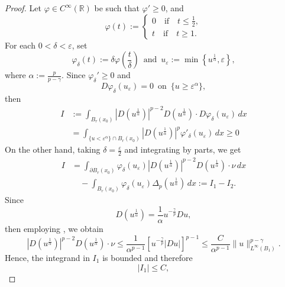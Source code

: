 \documentclass[10pt,a4paper]{amsart}
\newcommand{\R}{\mathbb{R}}
\begin{document}
\begin{proof}
    Let $\varphi\in C^\infty(\R)$ be such that $\varphi'\ge0$, and
    \begin{equation*}
    \varphi(t):=
    \begin{cases}
    0 \quad \textrm{if} \quad t\le\frac{1}{2},\\
    t \quad \textrm{if} \quad t\ge 1.
    \end{cases}
    \end{equation*}
    For each $0<\delta<\varepsilon$, set
    \begin{equation*}
    \varphi_\delta(t):=\delta\varphi\left(\frac{t}{\delta}\right)\,\,\,\text{and}\,\,\,u_\varepsilon:=\min\left\{ u^\frac{1}{\alpha},\varepsilon\right\},
    \end{equation*}
    where $\alpha:=\frac{p}{p-\gamma}$. Since $\varphi_\delta'\ge0$ and
    \begin{equation*}
        D\varphi_\delta(u_\varepsilon)=0\,\,\,\text{on}\,\,\,\{u\ge\varepsilon^\alpha\},
    \end{equation*}
    then
    \begin{align}\label{I is positive}
        I&:=\int_{B_r(x_0)}|D(u^{\frac{1}{\alpha}})|^{p-2}D(u^{\frac{1}{\alpha}})\cdot D\varphi_\delta(u_\varepsilon)\,dx\nonumber\\
        &=\int_{\{u<\varepsilon^\alpha\}\cap B_r(x_0)}|D(u^{\frac{1}{\alpha}})|^p\varphi'_\delta(u_\varepsilon)\,dx\ge0
    \end{align} 
    On the other hand, taking $\delta=\frac{\varepsilon}{2}$ and integrating by parts, we get
    \begin{align}\label{integration by parts}
        I&=\int_{\partial B_r(x_0)}\varphi_\delta(u_\varepsilon)|D(u^{\frac{1}{\alpha}})|^{p-2}D(u^{\frac{1}{\alpha}})\cdot\nu\,dx\nonumber\\
        &\quad-\int_{B_r(x_0)}\varphi_\delta(u_\varepsilon)\Delta_p(u^{\frac{1}{\alpha}})\,dx:=I_1-I_2.
    \end{align}
    Since 
    $$
     D(u^{\frac{1}{\alpha}})=\frac{1}{\alpha}u^{-\frac{\gamma}{p}}Du,
    $$
    then employing , we obtain
    $$
    |D(u^{\frac{1}{\alpha}})|^{p-2}D(u^{\frac{1}{\alpha}})\cdot\nu\le\frac{1}{\alpha^{p-1}}\left[u^{-\frac{\gamma}{p}}|Du|\right]^{p-1}\le\frac{C}{\alpha^{p-1}}\|u\|^{p-\gamma}_{L^\infty(B_1)}.
    $$
    Hence, the integrand in $I_1$ is bounded and therefore
    \begin{equation}\label{I1 is bounded}
        |I_1|\le C,
    \end{equation}

\end{proof}
\end{document}
